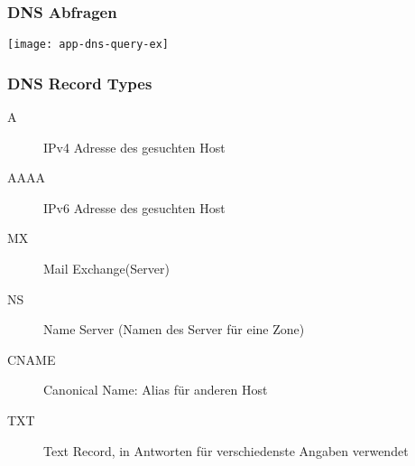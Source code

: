 \subsubsection{DNS Abfragen}

\texttt{[image: app-dns-query-ex]}


\subsubsection{DNS Record Types}
\begin{description}
	\item[A] IPv4 Adresse des gesuchten Host
	\item[AAAA] IPv6 Adresse des gesuchten Host
	\item[MX] Mail Exchange(Server)
	\item[NS] Name Server (Namen des Server für eine Zone)
	\item[CNAME] Canonical Name: Alias für anderen Host
	\item[TXT] Text Record, in Antworten für verschiedenste Angaben verwendet
\end{description}

